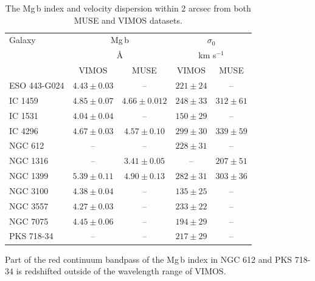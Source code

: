 			


			\begin{table}
				\centering
			\begin{threeparttable}
				\caption{The Mg\,b index and velocity dispersion within 2 arcsec from both MUSE and VIMOS datasets.}
				\label{tab:globalMg}
				\begin{tabular}{l c c c c}
					\hline
					\hline
					Galaxy 	& \multicolumn{2}{c}{Mg\,b} & \multicolumn{2}{c}{$\sigma_0$} \\
						& \multicolumn{2}{c}{\AA} & \multicolumn{2}{c}{km s$^{-1}$} \\
						& VIMOS & MUSE 	& VIMOS & MUSE \\
					\hline
					ESO 443-G024 & $4.43 \pm 0.03$ & -- & $221 \pm 24$ & -- \\
					IC 1459 	& $4.85\pm0.07$ & $4.66 \pm 0.012$ & $248\pm33$ & $312 \pm 61$ \\
					IC 1531 	& $4.04 \pm 0.04$ & -- & $150 \pm 29$ & -- \\
					IC 4296		& $4.67\pm0.03$ & $4.57 \pm 0.10$ &  $299\pm30$ & $339 \pm 59$ \\
					NGC 612 	& -- & -- & $228 \pm 31$ & -- \\
					NGC 1316 	& -- & $3.41 \pm 0.05$ & -- & $207 \pm 51$ \\
					NGC 1399 	& $5.39\pm0.11$ & $4.90 \pm 0.13$ & $282\pm31$ & $303 \pm 36$ \\
					NGC 3100 	& $4.38 \pm 0.04$ & -- & $135 \pm 25$ & -- \\
					NGC 3557 	& $4.27 \pm 0.03$ & -- & $233 \pm 22$ & -- \\
					NGC 7075 	& $4.45 \pm 0.06$ & -- & $194 \pm 29$ & -- \\
					PKS 718-34  & -- 		      & -- & $217 \pm 29$ & -- \\
					\hline
					\hline
				\end{tabular}
				\begin{tablenotes}
				\footnotesize
				\note Part of the red continuum bandpass of the Mg\,b index in NGC 612 and PKS 718-34 is redshifted outside of the wavelength range of VIMOS.
				\end{tablenotes}
			\end{threeparttable}
			\end{table}


